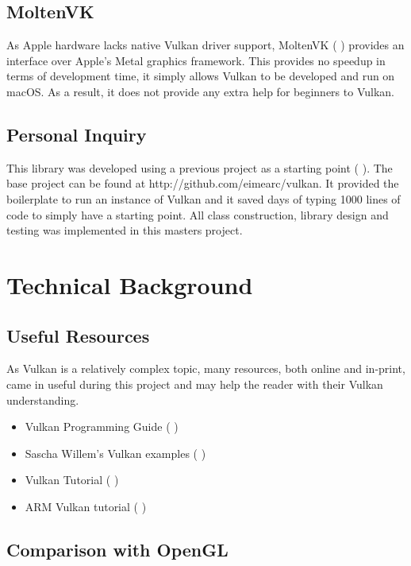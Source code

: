 \documentclass[12pt]{report}
\newcommand{\citebu}[1]{(\citeauthor{#1} \citeyear{#1})}
\newcommand{\citesoftware}[1]{(\citeauthor{#1} \citeyear{#1})}
\theoremstyle{definition}
\begin{document}
    \section{MoltenVK}

      As Apple hardware lacks native Vulkan driver support, MoltenVK
      \citesoftware{moltenvk} provides an interface over Apple's Metal graphics framework. This provides no
      speedup in terms of development time, it simply allows Vulkan to
      be developed and run on macOS. As a result, it does not provide any
      extra help for beginners to Vulkan.

    \section{Personal Inquiry}

      This library was developed using a previous project as a starting point \citebu{personalinquiry}.
      The base project can be found at http://github.com/eimearc/vulkan.
      It provided the boilerplate to run an instance of Vulkan and it
      saved days of typing 1000 lines of code to simply have a
      starting point. All class construction, library design
      and testing was implemented in this masters project.

  \chapter{Technical Background}

    \section{Useful Resources}

      As Vulkan is a relatively complex topic, many resources, both online and
      in-print, came in useful during this project and may help the reader
      with their Vulkan understanding.

      \begin{itemize}
        \item Vulkan Programming Guide \citebu{vulkanbook}
        \item Sascha Willem's Vulkan examples \citebu{sascha}
        \item Vulkan Tutorial \citebu{vulkantutorial}
        \item ARM Vulkan tutorial \citebu{arm}
      \end{itemize}

    \section{Comparison with OpenGL}
\end{document}
